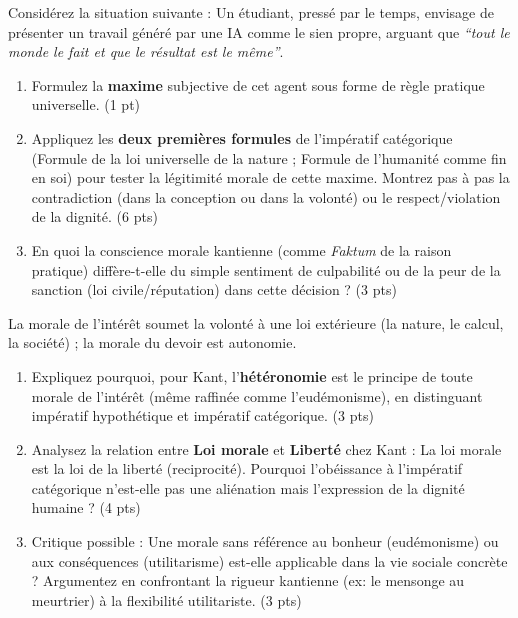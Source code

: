 \documentclass[11pt]{article}
\begin{document}
\begin{exercice}
\noindent Considérez la situation suivante : \og Un étudiant, pressé par le temps, envisage de présenter un travail généré par une IA comme le sien propre, arguant que \textit{``tout le monde le fait et que le résultat est le même''}.\fg{}
\begin{enumerate}
    \item Formulez la \textbf{maxime} subjective de cet agent sous forme de règle pratique universelle. (1 pt)
    \item Appliquez les \textbf{deux premières formules} de l'impératif catégorique (Formule de la loi universelle de la nature ; Formule de l'humanité comme fin en soi) pour tester la légitimité morale de cette maxime. Montrez pas à pas la contradiction (dans la conception ou dans la volonté) ou le respect/violation de la dignité. (6 pts)
    \item En quoi la \og conscience morale\fg{} kantienne (comme \textit{Faktum} de la raison pratique) diffère-t-elle du simple \og sentiment de culpabilité\fg{} ou de la \og peur de la sanction\fg{} (loi civile/réputation) dans cette décision ? (3 pts)
\end{enumerate}
\end{exercice}

\begin{exercice}
\noindent \og La morale de l'intérêt soumet la volonté à une loi extérieure (la nature, le calcul, la société) ; la morale du devoir est autonomie.\fg{}
\begin{enumerate}
    \item Expliquez pourquoi, pour Kant, l'\textbf{hétéronomie} est le principe de toute morale de l'intérêt (même raffinée comme l'eudémonisme), en distinguant \og impératif hypothétique\fg{} et \og impératif catégorique\fg{}. (3 pts)
    \item Analysez la relation entre \textbf{Loi morale} et \textbf{Liberté} chez Kant : \og La loi morale est la loi de la liberté\fg{} (reciprocité). Pourquoi l'obéissance à l'impératif catégorique n'est-elle pas une aliénation mais l'expression de la dignité humaine ? (4 pts)
    \item Critique possible : \og Une morale sans référence au bonheur (eudémonisme) ou aux conséquences (utilitarisme) est-elle applicable dans la vie sociale concrète ?\fg{} Argumentez en confrontant la \og rigueur\fg{} kantienne (ex: le mensonge au meurtrier) à la \og flexibilité\fg{} utilitariste. (3 pts)
\end{enumerate}
\end{exercice}
\end{document}
